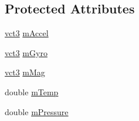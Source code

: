 \subsection*{Protected Attributes}
\begin{DoxyCompactItemize}
\item 
\hyperlink{vct_fixed_size_vector_types_8h_a3af82acdbf4eeb73c551909240b106ea}{vct3} \hyperlink{classprm_i_m_u_sensors_a74d634c113fe2bc5aaaeffd10e351305}{m\-Accel}
\item 
\hyperlink{vct_fixed_size_vector_types_8h_a3af82acdbf4eeb73c551909240b106ea}{vct3} \hyperlink{classprm_i_m_u_sensors_a7a38dc11afb30987fab2d1138f84d287}{m\-Gyro}
\item 
\hyperlink{vct_fixed_size_vector_types_8h_a3af82acdbf4eeb73c551909240b106ea}{vct3} \hyperlink{classprm_i_m_u_sensors_af53252673fffb8b2723b337eb9c344cc}{m\-Mag}
\item 
double \hyperlink{classprm_i_m_u_sensors_ab62434fbd875d0f7428761be427b5825}{m\-Temp}
\item 
double \hyperlink{classprm_i_m_u_sensors_abc350c599f43ec1e8ae00e374faa9615}{m\-Pressure}
\end{DoxyCompactItemize}


